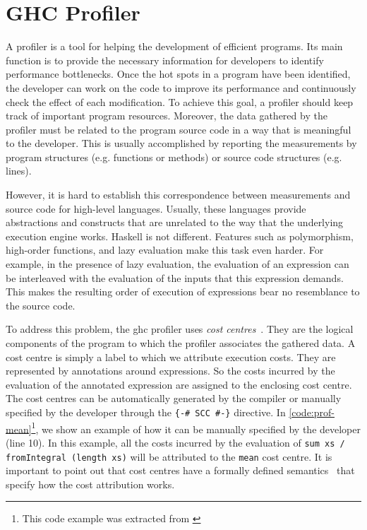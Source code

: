 \section{GHC Profiler}\label{sec:profiler}
A profiler is a tool for helping the development of efficient programs. Its main function is to provide the necessary information for developers to identify performance bottlenecks. Once the hot spots in a program have been identified, the developer can work on the code to improve its performance and continuously check the effect of each modification. To achieve this goal, a profiler should keep track of important program resources. Moreover, the data gathered by the profiler must be related to the program source code in a way that is meaningful to the developer. This is usually accomplished by reporting the measurements by program structures (e.g. functions or methods) or source code structures (e.g. lines).

However, it is hard to establish this correspondence between measurements and source code for high-level languages. Usually, these languages provide abstractions and constructs that are unrelated to the way that the underlying execution engine works. Haskell is not different. Features such as polymorphism, high-order functions, and lazy evaluation make this task even harder. For example, in the presence of lazy evaluation, the evaluation of an expression can be interleaved with the evaluation of the inputs that this expression demands. This makes the resulting order of execution of expressions bear no resemblance to the source code.

To address this problem, the \ac{ghc} profiler uses \emph{cost centres}~\cite{sansom:1995}. They are the logical components of the program to which the profiler associates the gathered data. A cost centre is simply a label to which we attribute execution costs. They are represented by annotations around expressions. So the costs incurred by the evaluation of the annotated expression are assigned to the enclosing cost centre. The cost centres can be automatically generated by the compiler or manually specified by the developer through the \texttt{\{-\# SCC \#-\}} directive. In \autoref{code:prof-mean}\footnote{This code example was extracted from \cite{sullivan:2008}}, we show an example of how it can be manually specified by the developer (line 10). In this example, all the costs incurred by the evaluation of \texttt{sum xs / fromIntegral (length xs)} will be attributed to the \texttt{mean} cost centre. It is important to point out that cost centres have a formally defined semantics~\cite{sansom:1995} that specify how the cost attribution works.

